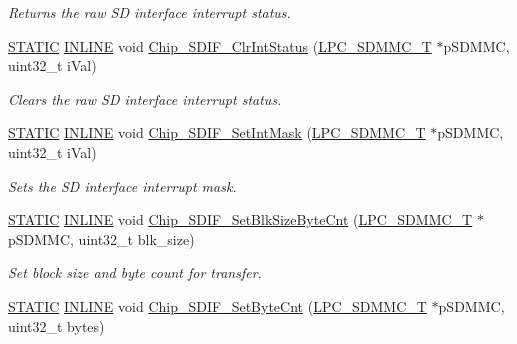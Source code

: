 \begin{DoxyCompactItemize}
\begin{DoxyCompactList}\small\item\em Returns the raw SD interface interrupt status. \end{DoxyCompactList}\item 
\hyperlink{group___l_p_c___types___public___macros_ga10b2d890d871e1489bb02b7e70d9bdfb}{S\+T\+A\+T\+IC} \hyperlink{spifi__18xx__43xx_8h_a2eb6f9e0395b47b8d5e3eeae4fe0c116}{I\+N\+L\+I\+NE} void \hyperlink{group___s_d_i_f__18_x_x__43_x_x_ga1898c632ce756134717a0942b969d52e}{Chip\+\_\+\+S\+D\+I\+F\+\_\+\+Clr\+Int\+Status} (\hyperlink{struct_l_p_c___s_d_m_m_c___t}{L\+P\+C\+\_\+\+S\+D\+M\+M\+C\+\_\+T} $\ast$p\+S\+D\+M\+MC, uint32\+\_\+t i\+Val)
\begin{DoxyCompactList}\small\item\em Clears the raw SD interface interrupt status. \end{DoxyCompactList}\item 
\hyperlink{group___l_p_c___types___public___macros_ga10b2d890d871e1489bb02b7e70d9bdfb}{S\+T\+A\+T\+IC} \hyperlink{spifi__18xx__43xx_8h_a2eb6f9e0395b47b8d5e3eeae4fe0c116}{I\+N\+L\+I\+NE} void \hyperlink{group___s_d_i_f__18_x_x__43_x_x_ga14b6323f09a6aec8289a4cf5a55afd63}{Chip\+\_\+\+S\+D\+I\+F\+\_\+\+Set\+Int\+Mask} (\hyperlink{struct_l_p_c___s_d_m_m_c___t}{L\+P\+C\+\_\+\+S\+D\+M\+M\+C\+\_\+T} $\ast$p\+S\+D\+M\+MC, uint32\+\_\+t i\+Val)
\begin{DoxyCompactList}\small\item\em Sets the SD interface interrupt mask. \end{DoxyCompactList}\item 
\hyperlink{group___l_p_c___types___public___macros_ga10b2d890d871e1489bb02b7e70d9bdfb}{S\+T\+A\+T\+IC} \hyperlink{spifi__18xx__43xx_8h_a2eb6f9e0395b47b8d5e3eeae4fe0c116}{I\+N\+L\+I\+NE} void \hyperlink{group___s_d_i_f__18_x_x__43_x_x_ga0599af26ab8f20447f3be5de625cc6c4}{Chip\+\_\+\+S\+D\+I\+F\+\_\+\+Set\+Blk\+Size\+Byte\+Cnt} (\hyperlink{struct_l_p_c___s_d_m_m_c___t}{L\+P\+C\+\_\+\+S\+D\+M\+M\+C\+\_\+T} $\ast$p\+S\+D\+M\+MC, uint32\+\_\+t blk\+\_\+size)
\begin{DoxyCompactList}\small\item\em Set block size and byte count for transfer. \end{DoxyCompactList}\item 
\hyperlink{group___l_p_c___types___public___macros_ga10b2d890d871e1489bb02b7e70d9bdfb}{S\+T\+A\+T\+IC} \hyperlink{spifi__18xx__43xx_8h_a2eb6f9e0395b47b8d5e3eeae4fe0c116}{I\+N\+L\+I\+NE} void \hyperlink{group___s_d_i_f__18_x_x__43_x_x_ga6d303a71c973895ec5a9552d1669d2c0}{Chip\+\_\+\+S\+D\+I\+F\+\_\+\+Set\+Byte\+Cnt} (\hyperlink{struct_l_p_c___s_d_m_m_c___t}{L\+P\+C\+\_\+\+S\+D\+M\+M\+C\+\_\+T} $\ast$p\+S\+D\+M\+MC, uint32\+\_\+t bytes)

\end{DoxyCompactItemize}
